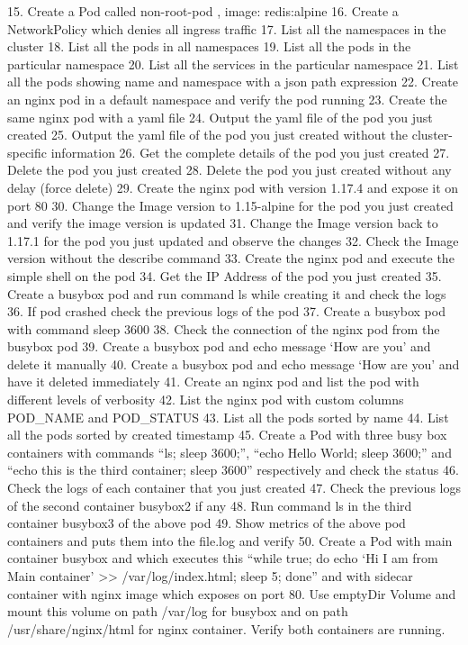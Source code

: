 15. Create a Pod called non-root-pod , image: redis:alpine
16. Create a NetworkPolicy which denies all ingress traffic
17. List all the namespaces in the cluster
18. List all the pods in all namespaces
19. List all the pods in the particular namespace
20. List all the services in the particular namespace
21. List all the pods showing name and namespace with a json path expression
22. Create an nginx pod in a default namespace and verify the pod running
23. Create the same nginx pod with a yaml file
24. Output the yaml file of the pod you just created
25. Output the yaml file of the pod you just created without the cluster-specific information
26. Get the complete details of the pod you just created
27. Delete the pod you just created
28. Delete the pod you just created without any delay (force delete)
29. Create the nginx pod with version 1.17.4 and expose it on port 80
30. Change the Image version to 1.15-alpine for the pod you just created and verify the image version is updated
31. Change the Image version back to 1.17.1 for the pod you just updated and observe the changes
32. Check the Image version without the describe command
33. Create the nginx pod and execute the simple shell on the pod
34. Get the IP Address of the pod you just created
35. Create a busybox pod and run command ls while creating it and check the logs
36. If pod crashed check the previous logs of the pod
37. Create a busybox pod with command sleep 3600
38. Check the connection of the nginx pod from the busybox pod
39. Create a busybox pod and echo message ‘How are you’ and delete it manually
40. Create a busybox pod and echo message ‘How are you’ and have it deleted immediately
41. Create an nginx pod and list the pod with different levels of verbosity
42. List the nginx pod with custom columns POD_NAME and POD_STATUS
43. List all the pods sorted by name
44. List all the pods sorted by created timestamp
45. Create a Pod with three busy box containers with commands “ls; sleep 3600;”, “echo Hello World; sleep 3600;” and “echo this is the third container; sleep 3600” respectively and check the status
46. Check the logs of each container that you just created
47. Check the previous logs of the second container busybox2 if any
48. Run command ls in the third container busybox3 of the above pod
49. Show metrics of the above pod containers and puts them into the file.log and verify
50. Create a Pod with main container busybox and which executes this “while true; do echo ‘Hi I am from Main container’ >> /var/log/index.html; sleep 5; done” and with sidecar container with nginx 
image which exposes on port 80. Use emptyDir Volume and mount this volume on path /var/log for busybox and on path /usr/share/nginx/html for nginx container. Verify both containers are running.
